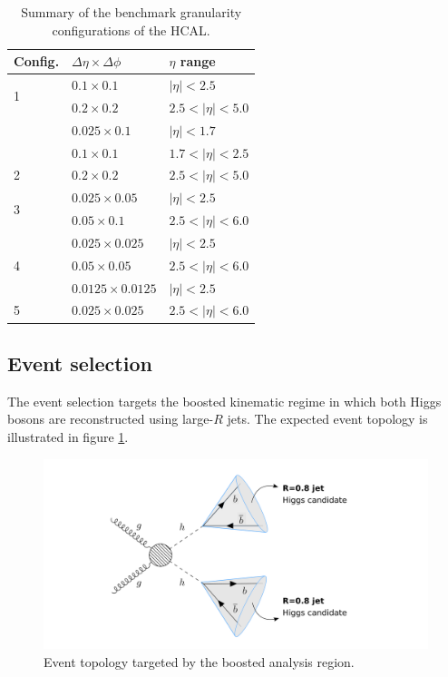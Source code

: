 \begin{table}
	\centering
	\begin{tabular}{lll}
		\toprule 
		\textbf{Config.} & $\Delta \eta \times \Delta \phi$ & $\eta$ range\\
		\midrule
		\multirow{2}{*}{1} & $0.1\times 0.1$  & $|\eta|<2.5$\\
		& $0.2\times 0.2$ & $2.5<|\eta|<5.0$ \\
		\cellcolor{black!7} &\cellcolor{black!7} $0.025\times 0.1$  & \cellcolor{black!7}$|\eta|<1.7$\\
		\cellcolor{black!7} & \cellcolor{black!7}$0.1\times 0.1$  & \cellcolor{black!7}$1.7<|\eta|<2.5$\\
		\multirow{-3}{*}{2} \cellcolor{black!7}& \cellcolor{black!7}$0.2\times 0.2$  &\cellcolor{black!7} $2.5<|\eta|<5.0$\\
		\multirow{2}{*}{3 }& $0.025\times0.05$ & $|\eta|<2.5$\\
		& $0.05\times 0.1$ & $2.5<|\eta|<6.0$ \\
		\cellcolor{black!7}&  \cellcolor{black!7}$0.025\times0.025$ &  \cellcolor{black!7}$|\eta|<2.5$\\
		\multirow{-2}{*}{4}\cellcolor{black!7}&  \cellcolor{black!7}$0.05\times 0.05$ & \cellcolor{black!7} $2.5<|\eta|<6.0$ \\
		& $0.0125\times0.0125$ &$|\eta|<2.5$\\
		\multirow{-2}{*}{5 }&$0.025\times 0.025$ & $2.5<|\eta|<6.0$\\
		\bottomrule
	\end{tabular}
	\caption{Summary of the benchmark granularity configurations of the HCAL.}
	\label{table:Gran}
\end{table}

\subsection{Event selection}

The event selection targets the boosted kinematic regime in which both Higgs bosons are reconstructed using large-$R$ jets. The expected event topology is illustrated in figure \ref{fig:boosted}.

\begin{figure}[h]
	\centering
	\includegraphics[trim={4.5cm .5cm 1cm .5cm},clip,width=1.2\linewidth]{./images/boosted1.png}
	\caption{Event topology targeted by the boosted analysis region.}
	\label{fig:boosted}
\end{figure}

